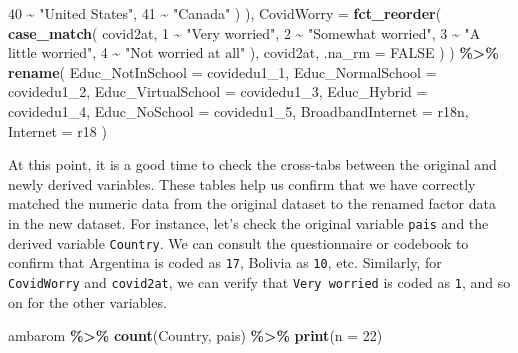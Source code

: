 \documentclass[
]{krantz}
\makeatletter
\newenvironment{Shaded}{\begin{snugshade}}{\end{snugshade}}
\newcommand{\AttributeTok}[1]{\textcolor[rgb]{0.27,0.27,0.27}{#1}}
\newcommand{\ConstantTok}[1]{\textcolor[rgb]{0.37,0.37,0.37}{#1}}
\newcommand{\DecValTok}[1]{\textcolor[rgb]{0.06,0.06,0.06}{#1}}
\newcommand{\FunctionTok}[1]{\textcolor[rgb]{0.27,0.27,0.27}{\textbf{#1}}}
\newcommand{\NormalTok}[1]{#1}
\newcommand{\SpecialCharTok}[1]{\textcolor[rgb]{0.43,0.43,0.43}{\textbf{#1}}}
\newcommand{\StringTok}[1]{\textcolor[rgb]{0.5,0.5,0.5}{#1}}
\newenvironment{kframe}{%
\medskip{}
\setlength{\fboxsep}{.8em}
 \def\at@end@of@kframe{}%
 \ifinner\ifhmode%
  \def\at@end@of@kframe{\end{minipage}}%
  \begin{minipage}{\columnwidth}%
 \fi\fi%
 \def\FrameCommand##1{\hskip\@totalleftmargin \hskip-\fboxsep
 \colorbox{shadecolor}{##1}\hskip-\fboxsep
     \hskip-\linewidth \hskip-\@totalleftmargin \hskip\columnwidth}%
 \MakeFramed {\advance\hsize-\width
   \@totalleftmargin\z@ \linewidth\hsize
   \@setminipage}}%
 {\par\unskip\endMakeFramed%
 \at@end@of@kframe}
\renewenvironment{Shaded}{\begin{kframe}}{\end{kframe}}
\makeatother
\begin{document}
\begin{Shaded}
\begin{Highlighting}[]
        \DecValTok{40} \SpecialCharTok{\textasciitilde{}} \StringTok{"United States"}\NormalTok{,}
        \DecValTok{41} \SpecialCharTok{\textasciitilde{}} \StringTok{"Canada"}
\NormalTok{      )}
\NormalTok{    ),}
    \AttributeTok{CovidWorry =} \FunctionTok{fct\_reorder}\NormalTok{(}
      \FunctionTok{case\_match}\NormalTok{(}
\NormalTok{        covid2at,}
        \DecValTok{1} \SpecialCharTok{\textasciitilde{}} \StringTok{"Very worried"}\NormalTok{,}
        \DecValTok{2} \SpecialCharTok{\textasciitilde{}} \StringTok{"Somewhat worried"}\NormalTok{,}
        \DecValTok{3} \SpecialCharTok{\textasciitilde{}} \StringTok{"A little worried"}\NormalTok{,}
        \DecValTok{4} \SpecialCharTok{\textasciitilde{}} \StringTok{"Not worried at all"}
\NormalTok{      ),}
\NormalTok{      covid2at,}
      \AttributeTok{.na\_rm =} \ConstantTok{FALSE}
\NormalTok{    )}
\NormalTok{  ) }\SpecialCharTok{\%\textgreater{}\%}
  \FunctionTok{rename}\NormalTok{(}
    \AttributeTok{Educ\_NotInSchool =}\NormalTok{ covidedu1\_1,}
    \AttributeTok{Educ\_NormalSchool =}\NormalTok{ covidedu1\_2,}
    \AttributeTok{Educ\_VirtualSchool =}\NormalTok{ covidedu1\_3,}
    \AttributeTok{Educ\_Hybrid =}\NormalTok{ covidedu1\_4,}
    \AttributeTok{Educ\_NoSchool =}\NormalTok{ covidedu1\_5,}
    \AttributeTok{BroadbandInternet =}\NormalTok{ r18n,}
    \AttributeTok{Internet =}\NormalTok{ r18}
\NormalTok{  )}
\end{Highlighting}
\end{Shaded}

At this point, it is a good time to check the cross-tabs between the original and newly derived variables. These tables help us confirm that we have correctly matched the numeric data from the original dataset to the renamed factor data in the new dataset. For instance, let's check the original variable \texttt{pais} and the derived variable \texttt{Country}. We can consult the questionnaire or codebook to confirm that Argentina is coded as \texttt{17}, Bolivia as \texttt{10}, etc. Similarly, for \texttt{CovidWorry} and \texttt{covid2at}, we can verify that \texttt{Very\ worried} is coded as \texttt{1}, and so on for the other variables.

\begin{Shaded}
\begin{Highlighting}[]
\NormalTok{ambarom }\SpecialCharTok{\%\textgreater{}\%}
  \FunctionTok{count}\NormalTok{(Country, pais) }\SpecialCharTok{\%\textgreater{}\%}
  \FunctionTok{print}\NormalTok{(}\AttributeTok{n =} \DecValTok{22}\NormalTok{)}
\end{Highlighting}
\end{Shaded}
\end{document}
